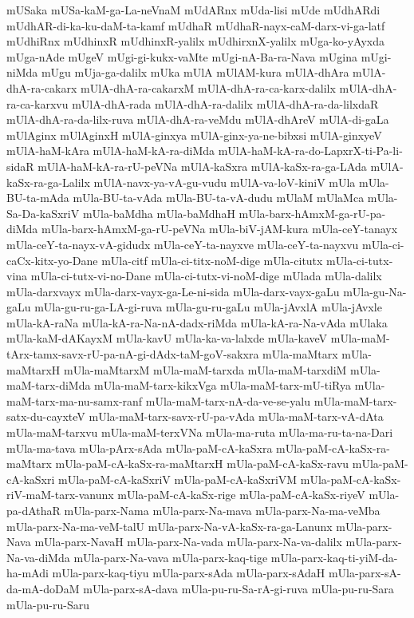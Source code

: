{mUSaka
mUSa-kaM-ga-La-neVnaM
mUdARnx
mUda-lisi
mUde
mUdhARdi
mUdhAR-di-ka-ku-daM-ta-kamf
mUdhaR
mUdhaR-nayx-caM-darx-vi-ga-latf
mUdhiRnx
mUdhinxR
mUdhinxR-yalilx
mUdhirxnX-yalilx
mUga-ko-yAyxda
mUga-nAde
mUgeV
mUgi-gi-kukx-vaMte
mUgi-nA-Ba-ra-Nava
mUgina
mUgi-niMda
mUgu
mUja-ga-dalilx
mUka
mUlA
mUlAM-kura
mUlA-dhAra
mUlA-dhA-ra-cakarx
mUlA-dhA-ra-cakarxM
mUlA-dhA-ra-ca-karx-dalilx
mUlA-dhA-ra-ca-karxvu
mUlA-dhA-rada
mUlA-dhA-ra-dalilx
mUlA-dhA-ra-da-lilxdaR
mUlA-dhA-ra-da-lilx-ruva
mUlA-dhA-ra-veMdu
mUlA-dhAreV
mUlA-di-gaLa
mUlAginx
mUlAginxH
mUlA-ginxya
mUlA-ginx-ya-ne-bibxsi
mUlA-ginxyeV
mUlA-haM-kAra
mUlA-haM-kA-ra-diMda
mUlA-haM-kA-ra-do-LapxrX-ti-Pa-li-sidaR
mUlA-haM-kA-ra-rU-peVNa
mUlA-kaSxra
mUlA-kaSx-ra-ga-LAda
mUlA-kaSx-ra-ga-Lalilx
mUlA-navx-ya-vA-gu-vudu
mUlA-va-loV-kiniV
mUla
mUla-BU-ta-mAda
mUla-BU-ta-vAda
mUla-BU-ta-vA-dudu
mUlaM
mUlaMca
mUla-Sa-Da-kaSxriV
mUla-baMdha
mUla-baMdhaH
mUla-barx-hAmxM-ga-rU-pa-diMda
mUla-barx-hAmxM-ga-rU-peVNa
mUla-biV-jAM-kura
mUla-ceY-tanayx
mUla-ceY-ta-nayx-vA-gidudx
mUla-ceY-ta-nayxve
mUla-ceY-ta-nayxvu
mUla-ci-caCx-kitx-yo-Dane
mUla-citf
mUla-ci-titx-noM-dige
mUla-citutx
mUla-ci-tutx-vina
mUla-ci-tutx-vi-no-Dane
mUla-ci-tutx-vi-noM-dige
mUlada
mUla-dalilx
mUla-darxvayx
mUla-darx-vayx-ga-Le-ni-sida
mUla-darx-vayx-gaLu
mUla-gu-Na-gaLu
mUla-gu-ru-ga-LA-gi-ruva
mUla-gu-ru-gaLu
mUla-jAvxlA
mUla-jAvxle
mUla-kA-raNa
mUla-kA-ra-Na-nA-dadx-riMda
mUla-kA-ra-Na-vAda
mUlaka
mUla-kaM-dAKayxM
mUla-kavU
mUla-ka-va-lalxde
mUla-kaveV
mUla-maM-tArx-tamx-savx-rU-pa-nA-gi-dAdx-taM-goV-sakxra
mUla-maMtarx
mUla-maMtarxH
mUla-maMtarxM
mUla-maM-tarxda
mUla-maM-tarxdiM
mUla-maM-tarx-diMda
mUla-maM-tarx-kikxVga
mUla-maM-tarx-mU-tiRya
mUla-maM-tarx-ma-nu-samx-ranf
mUla-maM-tarx-nA-da-ve-se-yalu
mUla-maM-tarx-satx-du-cayxteV
mUla-maM-tarx-savx-rU-pa-vAda
mUla-maM-tarx-vA-dAta
mUla-maM-tarxvu
mUla-maM-terxVNa
mUla-ma-ruta
mUla-ma-ru-ta-na-Dari
mUla-ma-tava
mUla-pArx-sAda
mUla-paM-cA-kaSxra
mUla-paM-cA-kaSx-ra-maMtarx
mUla-paM-cA-kaSx-ra-maMtarxH
mUla-paM-cA-kaSx-ravu
mUla-paM-cA-kaSxri
mUla-paM-cA-kaSxriV
mUla-paM-cA-kaSxriVM
mUla-paM-cA-kaSx-riV-maM-tarx-vanunx
mUla-paM-cA-kaSx-rige
mUla-paM-cA-kaSx-riyeV
mUla-pa-dAthaR
mUla-parx-Nama
mUla-parx-Na-mava
mUla-parx-Na-ma-veMba
mUla-parx-Na-ma-veM-talU
mUla-parx-Na-vA-kaSx-ra-ga-Lanunx
mUla-parx-Nava
mUla-parx-NavaH
mUla-parx-Na-vada
mUla-parx-Na-va-dalilx
mUla-parx-Na-va-diMda
mUla-parx-Na-vava
mUla-parx-kaq-tige
mUla-parx-kaq-ti-yiM-da-ha-mAdi
mUla-parx-kaq-tiyu
mUla-parx-sAda
mUla-parx-sAdaH
mUla-parx-sA-da-mA-doDaM
mUla-parx-sA-dava
mUla-pu-ru-Sa-rA-gi-ruva
mUla-pu-ru-Sara
mUla-pu-ru-Saru
}
